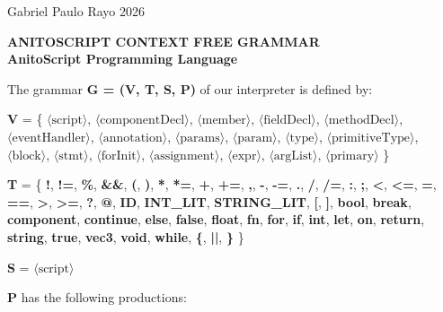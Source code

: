\documentclass[11pt,a4paper]{article}
\begin{document}
\noindent
Gabriel Paulo Rayo \hfill 2026\\

\vspace{1.5em}

\begin{center}
\textbf{\Large ANITOSCRIPT CONTEXT FREE GRAMMAR} \\[0.5em]
\textbf{\large AnitoScript Programming Language}
\end{center}

\vspace{1.5em}

\noindent
The grammar \textbf{G = (V, T, S, P)} of our interpreter is defined by:

\vspace{0.8em}
\noindent
\textbf{V} = \{ $\langle\text{script}\rangle$, $\langle\text{componentDecl}\rangle$, $\langle\text{member}\rangle$, $\langle\text{fieldDecl}\rangle$, $\langle\text{methodDecl}\rangle$, $\langle\text{eventHandler}\rangle$, $\langle\text{annotation}\rangle$, $\langle\text{params}\rangle$, $\langle\text{param}\rangle$, $\langle\text{type}\rangle$, $\langle\text{primitiveType}\rangle$, $\langle\text{block}\rangle$, $\langle\text{stmt}\rangle$, $\langle\text{forInit}\rangle$, $\langle\text{assignment}\rangle$, $\langle\text{expr}\rangle$, $\langle\text{argList}\rangle$, $\langle\text{primary}\rangle$ \}

\vspace{0.8em}
\noindent
\textbf{T} = \{ \textbf{!}, \textbf{!=}, \textbf{\%}, \textbf{\&\&}, \textbf{(}, \textbf{)}, \textbf{*}, \textbf{*=}, \textbf{+}, \textbf{+=}, \textbf{,}, \textbf{-}, \textbf{-=}, \textbf{.}, \textbf{/}, \textbf{/=}, \textbf{:}, \textbf{;}, \textbf{<}, \textbf{<=}, \textbf{=}, \textbf{==}, \textbf{>}, \textbf{>=}, \textbf{?}, \textbf{@}, \textbf{ID}, \textbf{INT\_LIT}, \textbf{STRING\_LIT}, \textbf{[}, \textbf{]}, \textbf{bool}, \textbf{break}, \textbf{component}, \textbf{continue}, \textbf{else}, \textbf{false}, \textbf{float}, \textbf{fn}, \textbf{for}, \textbf{if}, \textbf{int}, \textbf{let}, \textbf{on}, \textbf{return}, \textbf{string}, \textbf{true}, \textbf{vec3}, \textbf{void}, \textbf{while}, \textbf{\{}, \textbf{||}, \textbf{\}} \}

\vspace{0.8em}
\noindent
\textbf{S} = $\langle\text{script}\rangle$

\vspace{0.8em}
\noindent
\textbf{P} has the following productions:
\end{document}
